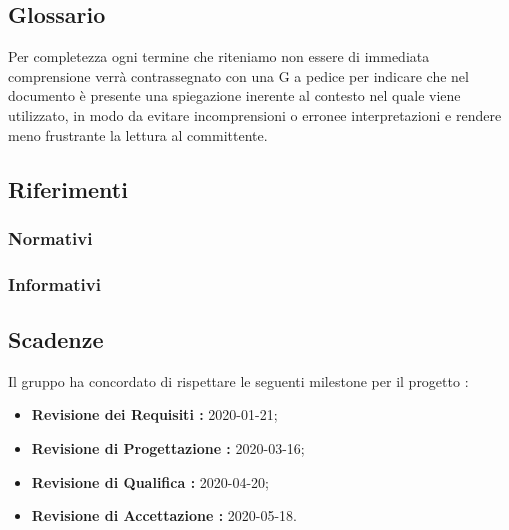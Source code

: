\subsection{Glossario}
Per completezza ogni termine che riteniamo non essere di immediata comprensione verrà contrassegnato con una G a pedice per indicare che nel documento  è presente una spiegazione inerente al contesto nel quale viene utilizzato,
in modo da evitare incomprensioni o erronee interpretazioni e rendere meno frustrante la lettura al committente.

\subsection{Riferimenti}
\subsubsection{Normativi}
\subsubsection{Informativi}

\subsection{Scadenze}
Il gruppo \Gruppo{} ha concordato di rispettare le seguenti milestone per il progetto \NomeProgetto{}:
\begin{itemize}
    \item \textbf{Revisione dei Requisiti : } 2020-01-21;
    \item \textbf{Revisione di Progettazione : } 2020-03-16;
    \item \textbf{Revisione di Qualifica : } 2020-04-20;
    \item \textbf{Revisione di Accettazione : } 2020-05-18.
\end{itemize}